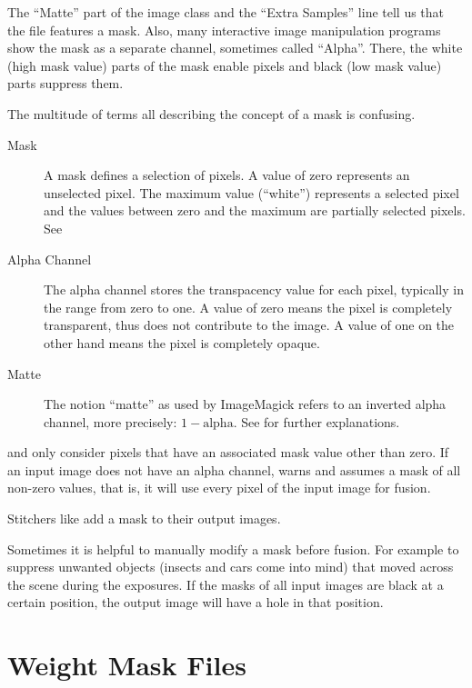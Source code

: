 The ``Matte'' part of the image class and the ``Extra Samples'' line
tell us that the file features a mask.  Also, many interactive image
manipulation programs show the mask as a separate channel, sometimes
called ``Alpha''.  There, the white (high mask value) parts of the
mask enable pixels and black (low mask value) parts suppress them.

The multitude of terms all describing the concept of a mask is
confusing.

\begin{description}
\item[Mask]\itemend A mask defines a selection of pixels.
  A value of zero represents an unselected pixel.  The maximum value
  (``white'') represents a selected pixel and the values between zero
  and the maximum are partially selected pixels.  See

\item[Alpha Channel]\itemend {} The alpha
  channel stores the transpacency value for each
  pixel, typically in the range from zero to one.  A value of zero
  means the pixel is completely transparent, thus does not contribute
  to the image.  A value of one on the other hand means the pixel is
  completely opaque.

\item[Matte]\itemend The notion ``matte'' as used by
  ImageMagick refers to an inverted alpha channel, more precisely: $1
  - \mbox{alpha}$.  See
   for further
  explanations.
\end{description}

 and  only consider pixels
that have an associated mask value other than zero.  If an input image
does not have an alpha channel,  warns and
assumes a mask of all non-zero values, that is, it will use every
pixel of the input image for fusion.

Stitchers like  add a mask to their output images.

Sometimes it is helpful to manually modify a mask before fusion.  For
example to suppress unwanted objects (insects and cars come into mind)
that moved across the scene during the exposures.  If the masks of all
input images are black at a certain position, the output image will
have a hole in that position.


\section[Weight Mask Files]{Weight Mask Files
  \label{sec:weight-mask-files}
  }


